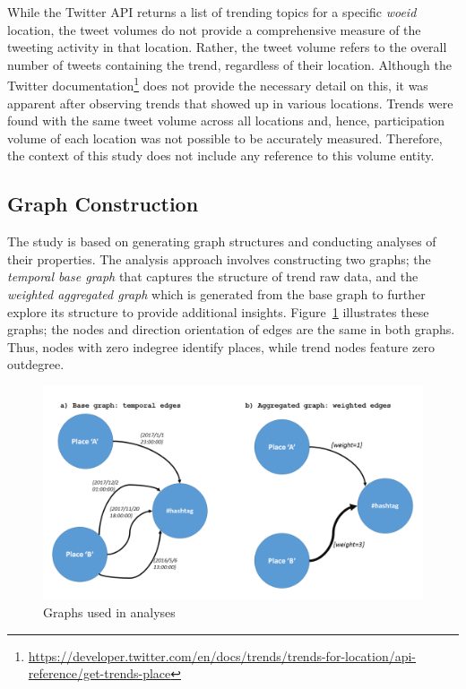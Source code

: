 \documentclass{llncs}
\begin{document}
While the Twitter API returns a list of trending topics for a specific
{\emph{woeid}} location, the tweet volumes do not provide a
comprehensive measure of the tweeting activity in that
location. Rather, the tweet volume refers to the overall number of
tweets containing the trend, regardless of their location. Although
the Twitter
documentation\footnote{\url{https://developer.twitter.com/en/docs/trends/trends-for-location/api-reference/get-trends-place}}
does not provide the necessary detail on this, it was apparent after
observing trends that showed up in various locations. Trends were
found with the same tweet volume across all locations and, hence,
participation volume of each location was not possible to be
accurately measured. Therefore, the context of this study does not
include any reference to this volume entity.

\subsection{Graph Construction}

The study is based on generating graph structures and conducting
analyses of their properties. The analysis approach involves
constructing two graphs; the {\emph{temporal base graph}} that
captures the structure of trend raw data, and the {\emph{weighted
aggregated graph}} which is generated from the base graph to further
explore its structure to provide additional
insights. Figure~\ref{fig:graphexamples} illustrates these graphs; the
nodes and direction orientation of edges are the same in both
graphs. Thus, nodes with zero indegree identify places, while trend
nodes feature zero outdegree.

\begin{figure}[!htb] \centering
\includegraphics[width=\columnwidth]{images/graphexamples.png}
\caption{Graphs used in analyses}
\label{fig:graphexamples}
\end{figure}
\end{document}
